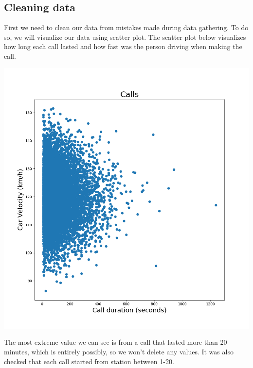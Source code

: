 \documentclass[12pt,a4paper]{article}
\begin{document}
\subsection{Cleaning data}
First we need to clean our data from mistakes made during data gathering. To do so, we will visualize our data using scatter plot. The scatter plot below visualizes how long each call lasted and how fast was the person driving when making the call.
\begin{center}
\includegraphics[width=6.5in]{Figure_0}
\end{center}
The most extreme value we can see is from a call that lasted more than 20 minutes, which is entirely possibly, so we won't delete any values. It was also checked that each call started from station between 1-20.
\pagebreak
\end{document}
